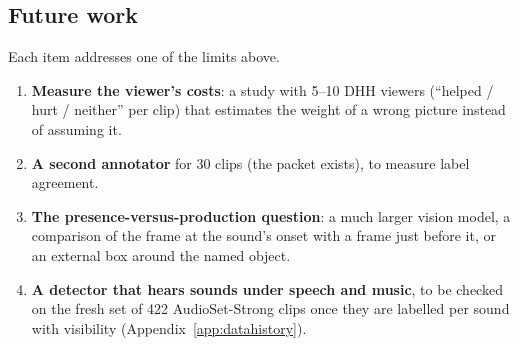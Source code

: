 \subsection{Future work}
Each item addresses one of the limits above.
\begin{enumerate}
  \item \textbf{Measure the viewer's costs}: a study with 5--10 DHH viewers (``helped / hurt / neither'' per clip) that
        estimates the weight of a wrong picture instead of assuming it.
  \item \textbf{A second annotator} for 30 clips (the packet exists), to measure label agreement.
  \item \textbf{The presence-versus-production question}: a much larger vision model, a comparison of the frame at the
        sound's onset with a frame just before it, or an external box around the named object.
  \item \textbf{A detector that hears sounds under speech and music}, to be checked on the fresh set of 422 AudioSet-Strong clips once they are labelled per sound with visibility
        (Appendix~\ref{app:datahistory}).
\end{enumerate}
